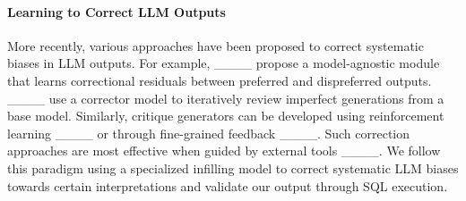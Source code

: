 \paragraph{Learning to Correct LLM Outputs} More recently, various approaches have been proposed to correct systematic biases in LLM outputs. For example, ____ propose a model-agnostic module that learns correctional residuals between preferred and dispreferred outputs. ____ use a corrector model to iteratively review imperfect generations from a base model. 
Similarly,  critique generators can be developed using reinforcement learning  ____  or through fine-grained feedback ____. Such correction approaches are most effective when guided by external tools ____. We follow this paradigm using a specialized infilling model to correct systematic  LLM biases towards certain interpretations and validate our output through SQL execution.